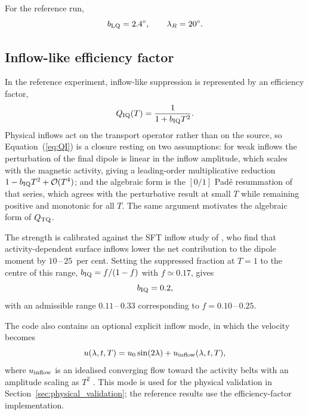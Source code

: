 \documentclass[namedreferences,hyperref,optionalrh,solaromanenum]{spr-sola}
\begin{document}
For the reference run,
%
\begin{equation}
b_{\rm LQ}=2.4^\circ,
\qquad
\lambda_R=20^\circ .
\label{eq:lq_params}
\end{equation}

\subsection{Inflow-like efficiency factor}
\label{subsec:inflow_equation}

In the reference experiment, inflow-like suppression is represented by an
efficiency factor,
%
\begin{equation}
Q_{\rm IQ}(T)
=
\frac{1}{1+b_{\rm IQ}T^2}.
\label{eq:QI}
\end{equation}
%
Physical inflows act on the transport operator rather than on the source,
so Equation~(\ref{eq:QI}) is a closure resting on two assumptions: for
weak inflows the perturbation of the final dipole is linear in the inflow
amplitude, which scales with the magnetic activity, giving a leading-order
multiplicative reduction $1-b_{\rm IQ}T^2+\mathcal{O}(T^4)$; and the
algebraic form is the $[0/1]$ Pad\'e resummation of that series, which
agrees with the perturbative result at small $T$ while remaining positive
and monotonic for all $T$. The same argument motivates the algebraic form
of $Q_{\rm TQ}$.

The strength is calibrated against the SFT inflow study of
\citet{Talafha2025}, who find that activity-dependent surface inflows
lower the net contribution to the dipole moment by $10$\,--\,$25$~per
cent. Setting the suppressed fraction at $T=1$ to the centre of this
range, $b_{\rm IQ}=f/(1-f)$ with $f\simeq0.17$, gives
%
\begin{equation}
b_{\rm IQ}=0.2,
\label{eq:bI_value}
\end{equation}
%
with an admissible range $0.11$\,--\,$0.33$ corresponding to
$f=0.10$\,--\,$0.25$.

The code also contains an optional explicit inflow mode, in which the
velocity becomes
%
\begin{equation}
u(\lambda,t,T)
=
u_0\sin(2\lambda)
+
u_{\rm inflow}(\lambda,t,T),
\label{eq:flow_with_inflow}
\end{equation}
%
where $u_{\rm inflow}$ is an idealised converging flow toward the activity
belts with an amplitude scaling as $T^2$
\citep[for the nonlinear impact of observed inflows in three-dimensional
Babcock--Leighton dynamo models, see][]{Teweldebirhan2024}. This mode is
used for the physical validation in
Section~\ref{sec:physical_validation}; the reference results use the
efficiency-factor implementation.
\end{document}
